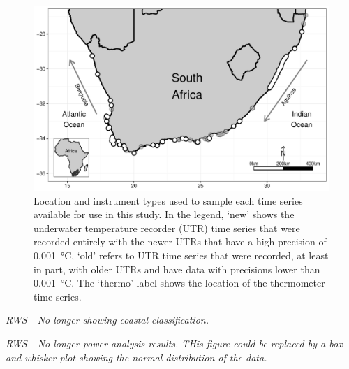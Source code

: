 \documentclass{ametsoc}
\begin{document}
%
\begin{figure}
\centering \includegraphics[width=1.0\textwidth]{figure01}
\caption[\small Location and instrument types used to sample each time series available for use in this study]{Location and instrument types used to sample each time series available for use in this study. In the legend, `new' shows the underwater temperature recorder (UTR) time series that were recorded entirely with the newer UTRs that have a high precision of \SI{0.001}{\degreeCelsius}, `old' refers to UTR time series that were recorded, at least in part, with older UTRs and have data with precisions lower than \SI{0.001}{\degreeCelsius}. The `thermo' label shows the location of the thermometer time series.}
\label{figure01}
\end{figure}

\emph{RWS - No longer showing coastal classification.}

\emph{RWS - No longer power analysis results. THis figure could be replaced by a box and whisker plot showing the normal distribution of the data.}
\end{document}

